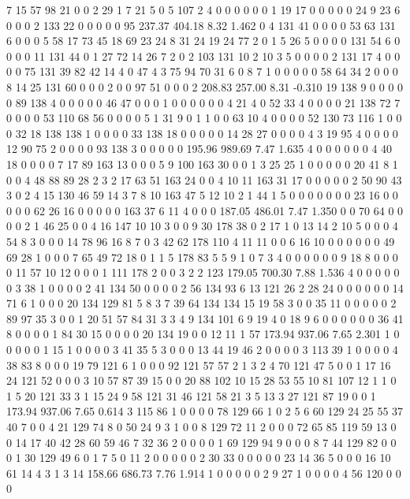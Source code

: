  7 15 57 98 21 0 0 2 29 1 7 21 5 0 5 107 2 4 0 0
 0 0 0 0 1 19 17 0 0 0 0 0 24 9 23 6 0 0 0 2
 133 22 0 0 0 0 0 95
237.37 404.18 8.32 1.462
 0 4 131 41 0 0 0 0 53 63 131 6 0 0 0 5 58 17 73 45
 18 69 23 24 8 31 24 19 24 77 2 0 1 5 26 5 0 0 0 0
 131 54 6 0 0 0 0 11 131 44 0 1 27 72 14 26 7 2 0 2
 103 131 10 2 10 3 5 0 0 0 0 2 131 17 4 0 0 0 0 75
 131 39 82 42 14 4 0 47 4 3 75 94 70 31 6 0 8 7 1 0
 0 0 0 0 58 64 34 2 0 0 0 8 14 25 131 60 0 0 0 2
 0 0 97 51 0 0 0 2
208.83 257.00 8.31 -0.310
 19 138 9 0 0 0 0 0 89 138 4 0 0 0 0 0 46 47 0 0
 0 1 0 0 0 0 0 0 4 21 4 0 52 33 4 0 0 0 0 21
 138 72 7 0 0 0 0 53 110 68 56 0 0 0 0 5 1 31 9 0
 1 1 0 0 63 10 4 0 0 0 0 52 130 73 116 1 0 0 0 32
 18 138 138 1 0 0 0 0 33 138 18 0 0 0 0 0 14 28 27 0
 0 0 0 4 3 19 95 4 0 0 0 0 12 90 75 2 0 0 0 0
 93 138 3 0 0 0 0 0
195.96 989.69 7.47 1.635
 4 0 0 0 0 0 0 4 40 18 0 0 0 0 7 17 89 163 13 0
 0 0 5 9 100 163 30 0 0 1 3 25 25 1 0 0 0 0 0 20
 41 8 1 0 0 4 48 88 89 28 2 3 2 17 63 51 163 24 0 0
 4 10 11 163 31 17 0 0 0 0 0 2 50 90 43 3 0 2 4 15
 130 46 59 14 3 7 8 10 163 47 5 12 10 2 1 44 1 5 0 0
 0 0 0 0 0 23 16 0 0 0 0 0 62 26 16 0 0 0 0 0
 163 37 6 11 4 0 0 0
187.05 486.01 7.47 1.350
 0 0 70 64 0 0 0 0 2 1 46 25 0 0 4 16 147 10 10 3
 0 0 9 30 178 38 0 2 17 1 0 13 14 2 10 5 0 0 0 4
 54 8 3 0 0 0 14 78 96 16 8 7 0 3 42 62 178 110 4 11
 11 0 0 6 16 10 0 0 0 0 0 0 49 69 28 1 0 0 0 7
 65 49 72 18 0 1 1 5 178 83 5 5 9 1 0 7 3 4 0 0
 0 0 0 0 9 18 8 0 0 0 0 11 57 10 12 0 0 0 1 111
 178 2 0 0 3 2 2 123
179.05 700.30 7.88 1.536
 4 0 0 0 0 0 0 3 38 1 0 0 0 0 2 41 134 50 0 0
 0 0 2 56 134 93 6 13 121 26 2 28 24 0 0 0 0 0 0 14
 71 6 1 0 0 0 20 134 129 81 5 8 3 7 39 64 134 134 15 19
 58 3 0 0 35 11 0 0 0 0 0 2 89 97 35 3 0 0 1 20
 51 57 84 31 3 3 4 9 134 101 6 9 19 4 0 18 9 6 0 0
 0 0 0 0 36 41 8 0 0 0 0 1 84 30 15 0 0 0 0 20
 134 19 0 0 12 11 1 57
173.94 937.06 7.65 2.301
 1 0 0 0 0 0 1 15 1 0 0 0 0 3 41 35 5 3 0 0
 0 13 44 19 46 2 0 0 0 0 3 113 39 1 0 0 0 0 4 38
 83 8 0 0 0 19 79 121 6 1 0 0 0 92 121 57 57 2 1 3
 2 4 70 121 47 5 0 0 1 17 16 24 121 52 0 0 0 3 10 57
 87 39 15 0 0 20 88 102 10 15 28 53 55 10 81 107 12 1 1 0
 1 5 20 121 33 3 1 15 24 9 58 121 31 46 121 58 21 3 5 13
 3 27 121 87 19 0 0 1
173.94 937.06 7.65 0.614
 3 115 86 1 0 0 0 0 78 129 66 1 0 2 5 6 60 129 24 25
 55 37 40 7 0 0 4 21 129 74 8 0 50 24 9 3 1 0 0 8
 129 72 11 2 0 0 0 72 65 85 119 59 13 0 0 14 17 40 42 28
 60 59 46 7 32 36 2 0 0 0 0 1 69 129 94 9 0 0 0 8
 7 44 129 82 0 0 0 1 30 129 49 6 0 1 7 5 0 11 2 0
 0 0 0 0 2 30 33 0 0 0 0 0 23 14 36 5 0 0 0 16
 10 61 14 4 3 1 3 14
158.66 686.73 7.76 1.914
 1 0 0 0 0 0 2 9 27 1 0 0 0 0 4 56 120 0 0 0

